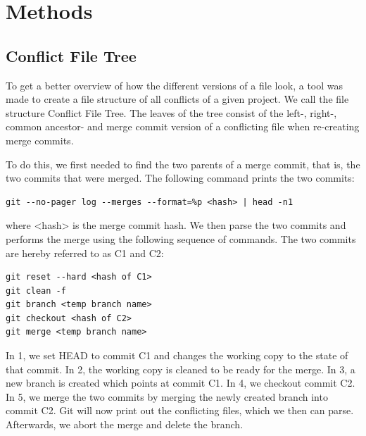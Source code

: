 \chapter{Methods}
\section{Conflict File Tree}
To get a better overview of how the different versions of a file look, a tool was made to create a file structure of all conflicts of a given project. We call the file structure Conflict File Tree. The leaves of the tree consist of the left-, right-, common ancestor- and merge commit version of a conflicting file when re-creating merge commits. 

To do this, we first needed to find the two parents of a merge commit, that is, the two commits that were merged. The following command prints the two commits:
\lstset{language=Bash}
\begin{lstlisting}[frame=single]
git --no-pager log --merges --format=%p <hash> | head -n1
\end{lstlisting}
where <hash> is the merge commit hash. We then parse the two commits and performs the merge using the following sequence of commands. The two commits are hereby referred to as C1 and C2:\\
\lstset{language=Bash,numbers=left,xleftmargin=2em,frame=single,framexleftmargin=1.5em}
\begin{lstlisting}[frame=single]
git reset --hard <hash of C1>
git clean -f
git branch <temp branch name>
git checkout <hash of C2>
git merge <temp branch name>
\end{lstlisting}
In 1, we set HEAD to commit C1 and changes the working copy to the state of that commit. In 2,  the working copy is cleaned to be ready for the merge. In 3, a new branch is created which points at commit C1. In 4, we checkout commit C2. In 5, we merge the two commits by merging the newly created branch into commit C2. Git will now print out the conflicting files, which we then can parse. Afterwards, we abort the merge and delete the branch.


